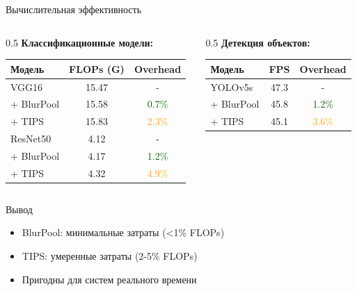 \documentclass[aspectratio=169]{beamer}
\begin{document}
\begin{frame}{Вычислительная эффективность}
    \begin{columns}
        \begin{column}{0.5\textwidth}
                        \textbf{Классификационные модели:}
            \begin{table}[h]
            \centering
            \footnotesize
            \begin{tabular}{|l|c|c|}
            \hline
            \textbf{Модель} & \textbf{FLOPs (G)} & \textbf{Overhead} \\
            \hline
            VGG16 & 15.47 & - \\
             + BlurPool & 15.58 & \textcolor{darkgreen}{0.7\%} \\
             + TIPS & 15.83 & \textcolor{orange}{2.3\%} \\
            \hline
            ResNet50 & 4.12 & - \\
             + BlurPool & 4.17 & \textcolor{darkgreen}{1.2\%} \\
             + TIPS & 4.32 & \textcolor{orange}{4.9\%} \\
            \hline
            \end{tabular}
            \end{table}
        \end{column}
        \begin{column}{0.5\textwidth}
                        \textbf{Детекция объектов:}
            \begin{table}[h]
            \centering
            \footnotesize
            \begin{tabular}{|l|c|c|}
            \hline
            \textbf{Модель} & \textbf{FPS} & \textbf{Overhead} \\
            \hline
            YOLOv5s & 47.3 & - \\
             + BlurPool & 45.8 & \textcolor{darkgreen}{1.2\%} \\
             + TIPS & 45.1 & \textcolor{orange}{3.6\%} \\
            \hline
            \end{tabular}
            \end{table}
        \end{column}
    \end{columns}
    
    \vspace{0.5cm}
    
    \begin{block}{Вывод}
        \begin{itemize}
            \item BlurPool: минимальные затраты (<1\% FLOPs)
            \item TIPS: умеренные затраты (2-5\% FLOPs)
            \item Пригодны для систем реального времени
        \end{itemize}
    \end{block}
\end{frame}
\end{document}
